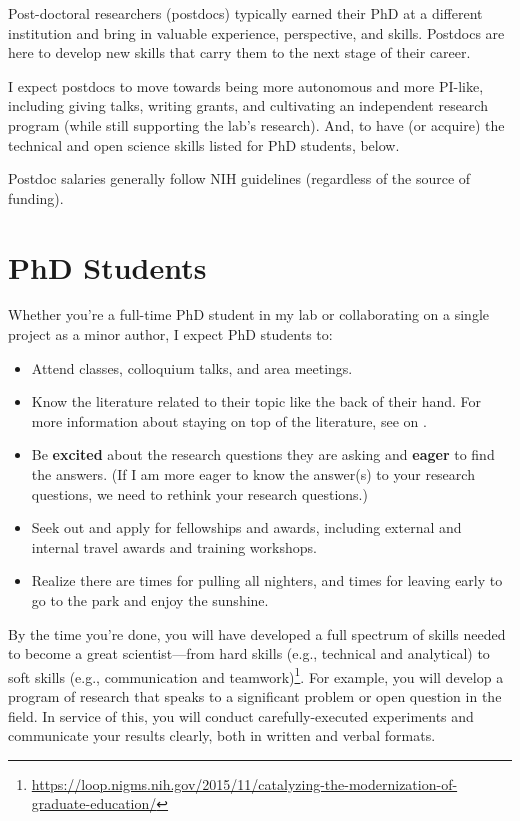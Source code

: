 \documentclass[letterpaper,11pt,oneside]{memoir}
\begin{document}
Post-doctoral researchers (postdocs) typically earned their PhD at a different institution and bring in valuable experience, perspective, and skills. Postdocs are here to develop new skills that carry them to the next stage of their career. 

I expect postdocs to move towards being more autonomous and more PI-like, including giving talks, writing grants, and cultivating an independent research program (while still supporting the lab's research). And, to have (or acquire) the technical and open science skills listed for PhD students, below. 

Postdoc salaries generally follow NIH guidelines (regardless of the source of funding).



\section{PhD Students}

Whether you're a full-time PhD student in my lab or collaborating on a single project as a minor author, I expect PhD students to:

\begin{itemize}
\item Attend classes, colloquium talks, and area meetings.
\item Know the literature related to their topic like the back of their hand. For more information about staying on top of the literature, see  on .
\item Be \textbf{excited} about the research questions they are asking and \textbf{eager} to find the answers. (If I am more eager to know the answer(s) to your research questions, we need to rethink your research questions.)
\item Seek out and apply for fellowships and awards, including external and internal travel awards and training workshops.
\item Realize there are times for pulling all nighters, and times for leaving early to go to the park and enjoy the sunshine.
\end{itemize}

By the time you're done, you will have developed a full spectrum of skills needed to become a great scientist---from hard skills (e.g., technical and analytical) to soft skills (e.g., communication and teamwork)\footnote{\url{https://loop.nigms.nih.gov/2015/11/catalyzing-the-modernization-of-graduate-education/}}. For example, you will develop a program of research that speaks to a significant problem or open question in the field. In service of this, you will conduct carefully-executed experiments and communicate your results clearly, both in written and verbal formats. 
\end{document}
